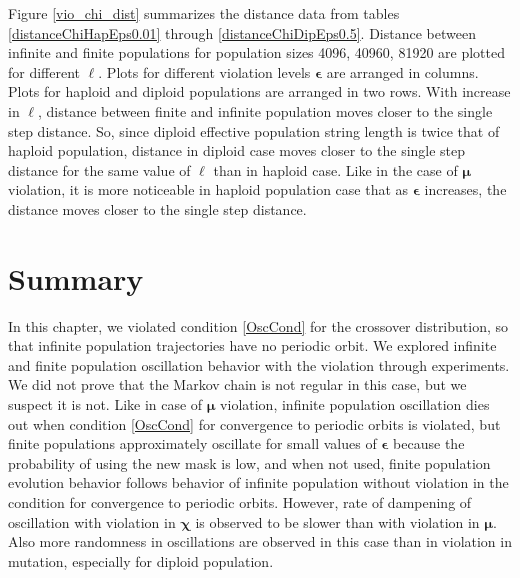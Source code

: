 Figure \ref{vio_chi_dist} summarizes the distance data from tables \ref{distanceChiHapEps0.01} through 
\ref{distanceChiDipEps0.5}. Distance between infinite and finite populations 
for population sizes {4096, 40960, 81920} are plotted for different $\ell$. 
Plots for different violation levels $\bm{\epsilon}$ are arranged in columns. 
Plots for haploid and diploid populations are arranged in two rows. With increase in $\ell$, 
distance between finite and infinite population moves closer to the single step distance. So, since diploid effective population 
string length is twice that of haploid population, 
distance in diploid case moves closer to the single step distance for the same value of $\ell$ than in haploid case. 
Like in the case of $\bm{\mu}$ violation, it is more noticeable in haploid population case that as $\bm{\epsilon}$ increases, 
the distance moves closer to the single step distance.

\section{Summary}
In this chapter, we violated condition \ref{OscCond} for the crossover distribution, 
so that infinite population trajectories have no periodic orbit. 
We explored infinite and finite population oscillation behavior with the violation through experiments. 
We did not prove that the Markov chain is not regular in this case, but we suspect it is not.  
Like in case of $\bm{\mu}$ violation, infinite population oscillation dies out when condition \ref{OscCond} for convergence to 
periodic orbits is violated, but finite populations approximately oscillate for small values of $\bm{\epsilon}$ 
because the probability of using the new mask is low, and when not used, 
finite population evolution behavior follows behavior of infinite population without violation in the condition for convergence to 
periodic orbits. However, rate of dampening of oscillation with violation 
in $\bm{\chi}$ is observed to be slower than with violation in ${\bm{\mu}}$. Also more randomness in oscillations are observed 
in this case than in violation in mutation, especially for diploid population.




